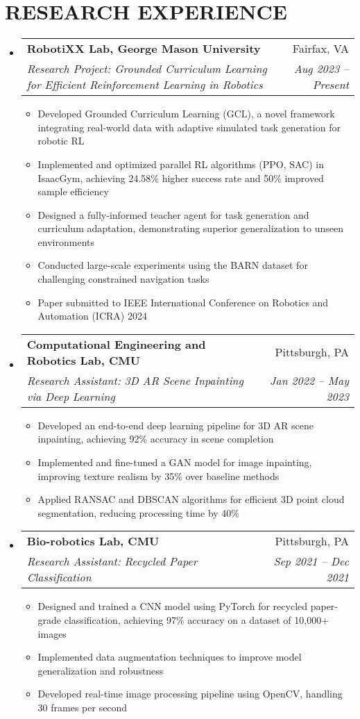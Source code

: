 \documentclass[letterpaper,10pt]{article}
\makeatletter
\newcommand{\resumeItem}[1]{
  \item\small{
    #1 \vspace{-2pt}
  }
}
\newcommand{\resumeSubheading}[4]{
  \vspace{-2pt}\item
    \begin{tabular*}{0.97\textwidth}{l@{\extracolsep{\fill}}r}
      \textbf{#1} & #2 \\
      \textit{\small#3} & \textit{\small #4} \\
    \end{tabular*}\vspace{-7pt}
}
\newcommand{\resumeSubHeadingListStart}{\begin{itemize}[leftmargin=0.15in, label={}]}
\newcommand{\resumeSubHeadingListEnd}{\end{itemize}}
\newcommand{\resumeItemListStart}{\begin{itemize}[leftmargin=0.25in, label=\tiny$\bullet$]}
\newcommand{\resumeItemListEnd}{\end{itemize}\vspace{-5pt}}
\makeatother
\begin{document}
\section{RESEARCH EXPERIENCE}
  \resumeSubHeadingListStart
    \resumeSubheading
      {RobotiXX Lab, George Mason University}{Fairfax, VA}
      {Research Project: Grounded Curriculum Learning for Efficient Reinforcement Learning in Robotics}{Aug 2023 – Present}
      \resumeItemListStart
        \resumeItem{Developed Grounded Curriculum Learning (GCL), a novel framework integrating real-world data with adaptive simulated task generation for robotic RL}
        \resumeItem{Implemented and optimized parallel RL algorithms (PPO, SAC) in IsaacGym, achieving 24.58\% higher success rate and 50\% improved sample efficiency}
        \resumeItem{Designed a fully-informed teacher agent for task generation and curriculum adaptation, demonstrating superior generalization to unseen environments}
        \resumeItem{Conducted large-scale experiments using the BARN dataset for challenging constrained navigation tasks}
        \resumeItem{Paper submitted to IEEE International Conference on Robotics and Automation (ICRA) 2024}
      \resumeItemListEnd
    \resumeSubheading
      {Computational Engineering and Robotics Lab, CMU}{Pittsburgh, PA}
      {Research Assistant: 3D AR Scene Inpainting via Deep Learning}{Jan 2022 – May 2023}
      \resumeItemListStart
        \resumeItem{Developed an end-to-end deep learning pipeline for 3D AR scene inpainting, achieving 92\% accuracy in scene completion}
        \resumeItem{Implemented and fine-tuned a GAN model for image inpainting, improving texture realism by 35\% over baseline methods}
        \resumeItem{Applied RANSAC and DBSCAN algorithms for efficient 3D point cloud segmentation, reducing processing time by 40\%}
      \resumeItemListEnd
    \resumeSubheading
      {Bio-robotics Lab, CMU}{Pittsburgh, PA}
      {Research Assistant: Recycled Paper Classification}{Sep 2021 – Dec 2021}
      \resumeItemListStart
        \resumeItem{Designed and trained a CNN model using PyTorch for recycled paper-grade classification, achieving 97\% accuracy on a dataset of 10,000+ images}
        \resumeItem{Implemented data augmentation techniques to improve model generalization and robustness}
        \resumeItem{Developed real-time image processing pipeline using OpenCV, handling 30 frames per second}
      \resumeItemListEnd
  \resumeSubHeadingListEnd

\end{document}
